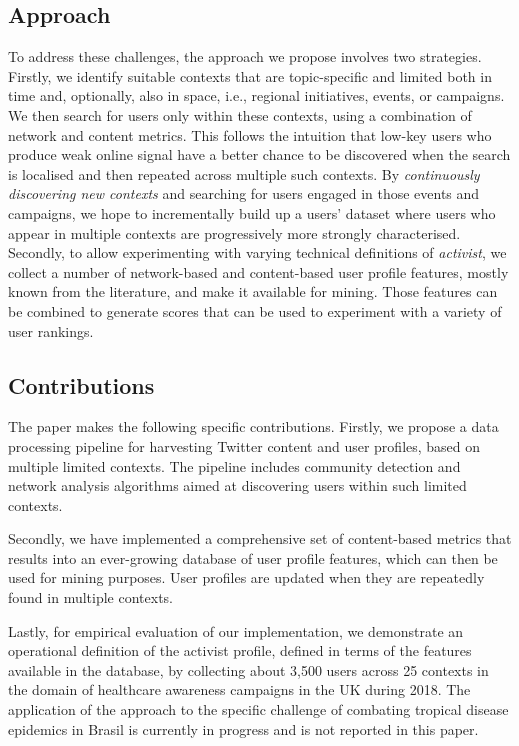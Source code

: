 \documentclass[runningheads]{llncs}
\begin{document}
\subsection{Approach}

To address these challenges, the approach we propose involves two strategies. 
Firstly, we identify suitable contexts that are topic-specific and limited both in time and, optionally, also in space, i.e., regional initiatives, events, or campaigns.
We then search for users only within these contexts, using a combination of network and content metrics. 
This follows the intuition that low-key users who produce weak online signal have a better chance to be discovered when the search is localised and then repeated across multiple such contexts.
By \textit{continuously discovering new contexts} and searching for users engaged in those events and campaigns, we hope to incrementally build up a users' dataset where users who appear in multiple contexts are progressively more strongly characterised.
%
Secondly, to allow experimenting with varying technical definitions of \textit{activist}, we collect a number of network-based and content-based user profile features, mostly known from the literature, and make it available for mining. Those features can be combined to generate scores that can be used to experiment with a variety of user rankings.

\subsection{ Contributions}
The paper makes the following specific contributions.
%
Firstly, we propose a data processing pipeline for harvesting Twitter content and user profiles, based on multiple limited contexts. 
The pipeline includes community detection and network analysis algorithms aimed at discovering users within such limited contexts.

Secondly, we have implemented a comprehensive set of content-based metrics that results into an ever-growing database of user profile features, which can then be used for mining purposes. 
User profiles are updated when they are repeatedly found in multiple contexts.

Lastly, for empirical evaluation of our implementation, we demonstrate an operational definition of the activist profile, defined in terms of the features available in the database, by collecting about 3,500 users  across 25 contexts in the domain of healthcare awareness campaigns in the UK during 2018. 
The application of the approach to the specific challenge of combating tropical disease epidemics in Brasil is currently in progress and is not reported in this paper.
\end{document}

